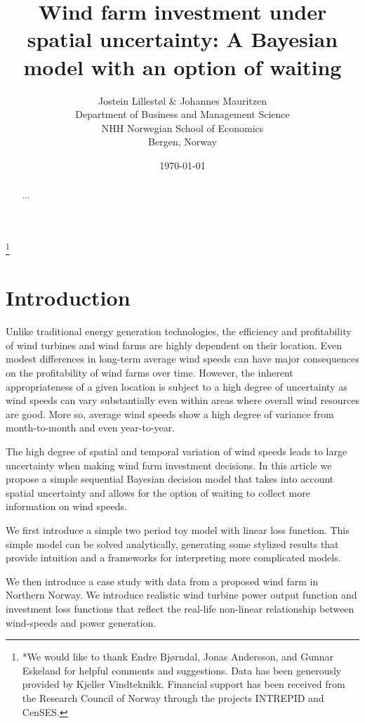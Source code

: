 \documentclass[11pt]{article}
\title{Wind farm investment under spatial uncertainty: A Bayesian model with an option of waiting}
\author{Jostein Lillest\o l \& Johannes Mauritzen\\
 		Department of Business and Management Science\\
   NHH Norwegian School of Economics\\
   Bergen, Norway\\
		}
\date{\today}
\begin{document}
\begin{spacing}{1} %

\maketitle

\begin{abstract}
 ...
\end{abstract}

\thanks{*We would like to thank Endre Bj\o rndal, Jonas Andersson, and Gunnar Eskeland for helpful comments and suggestions. Data has been generously provided by Kjeller Vindteknikk. Financial support has been received from the Research Council of Norway through the projects INTREPID and CenSES.}
\end{spacing}

\section{Introduction}

Unlike traditional energy generation technologies, the efficiency and profitability of wind turbines and wind farms are highly dependent on their location. Even modest differences in long-term average wind speeds can have major consequences on the profitability of wind farms over time. However, the inherent appropriateness of a given location is subject to a high degree of uncertainty as wind speeds can vary substantially even within areas where overall wind resources are good. More so, average wind speeds show a high degree of variance from month-to-month and even year-to-year.

The high degree of spatial and temporal variation of wind speeds leads to large uncertainty when making wind farm investment decisions. In this article we propose a simple sequential Bayesian decision model that takes into account spatial uncertainty and allows for the option of waiting to collect more information on wind speeds.

We first introduce a simple two period toy model with linear loss function. This simple model can be solved analytically, generating some stylized results that provide intuition and a frameworks for interpreting more complicated models. 

We then introduce a case study with data from a proposed wind farm in Northern Norway. We introduce realistic wind turbine power output function and investment loss functions that reflect the real-life non-linear relationship between wind-speeds and power generation. 
\end{document}
